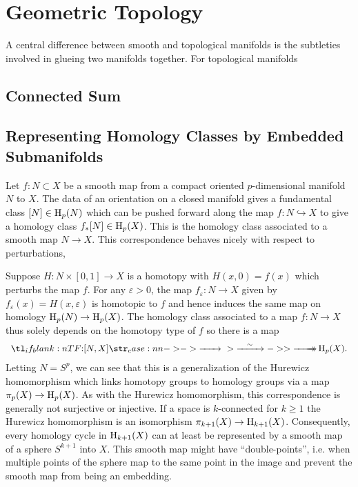 \section{Geometric Topology}\label{sec:differential-topology}

A central difference between smooth and topological manifolds is the subtleties involved in glueing two manifolds together. For topological manifolds

\subsection{Connected Sum}

\subsection{Representing Homology Classes by Embedded Submanifolds}

Let $f : N\subset X$ be a smooth map from a compact oriented $p$-dimensional manifold $N$ to $X$. The data of an orientation on a closed manifold gives a fundamental class $[N]\in \operatorname{H}_p(N)$ which can be pushed forward along the map $f : N \hookrightarrow X$ to give a homology class $f_* [N]\in \operatorname{H}_p(X)$. This is the homology class associated to a smooth map $N\to X$.
This correspondence behaves nicely with respect to perturbations, 

Suppose $H : N\times [0,1] \to X$ is a homotopy with $H(x,0)=f(x)$ which perturbs the map $f$. For any $\varepsilon>0$, the map $f_\varepsilon : N \to X$ given by $f_\varepsilon(x)=H(x,\varepsilon)$ is homotopic to $f$ and hence induces the same map on homology $\operatorname{H}_p(N)\to \operatorname{H}_p(X)$. The homology class associated to a map $f : N \to X$ thus solely depends on the homotopy type of $f$ so there is a map
\[
	\lkxfunc{}{[N,X]}{\H_p(X).}
\]
Letting $N=S^p$, we can see that this is a generalization of the Hurewicz homomorphism which links homotopy groups to homology groups via a map $\pi_p(X) \to \operatorname{H}_p(X)$.
As with the Hurewicz homomorphism, this correspondence is generally not surjective or injective. If a space is $k$-connected for $k\geq 1$ the Hurewicz homomorphism is an isomorphism $\pi_{k+1}(X) \to \operatorname{H}_{k+1}(X)$. Consequently, every homology cycle in $\operatorname{H}_{k+1}(X)$ can at least be represented by a smooth map of a sphere $S^{k+1}$ into $X$. This smooth map might have ``double-points'', i.e. when multiple points of the sphere map to the same point in the image and prevent the smooth map from being an embedding.

